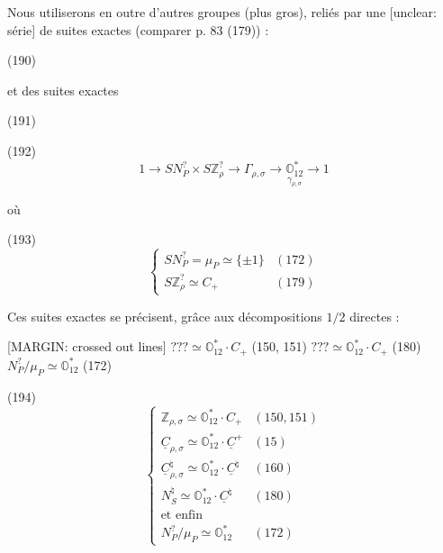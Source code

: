 Nous utiliserons en outre d'autres groupes (plus gros), reliés par une [unclear: série] de suites exactes (comparer p. 83 (179)) :

\newpage


(190)

et des suites exactes

(191)

(192)
$$1 \to S N^?_P \times S\mathbb{Z}^?_\rho \to \Gamma_{\rho,\sigma} \to \underset{\gamma_{\rho,\sigma}}{\mathbb{O}_{12}^*} \to 1$$

où

(193)
$$ \begin{cases} S N^?_P = \mu_P \simeq \{\pm 1\} & (172) \\ S\mathbb{Z}^?_\rho \simeq C_+ & (179) \end{cases} $$

Ces suites exactes se précisent, grâce
aux décompositions $1/2$ directes :

[MARGIN: crossed out lines]
$??? \simeq \mathbb{O}_{12}^* \cdot C_+$ (150, 151)
$??? \simeq \mathbb{O}_{12}^* \cdot C_+$ (180)
$N^?_P / \mu_P \simeq \mathbb{O}_{12}^*$ (172)

(194)
$$ \begin{cases} \mathbb{Z}_{\rho,\sigma} \simeq \mathbb{O}_{12}^* \cdot C_+ & (150, 151) \\ \underline{C}_{\rho,\sigma} \simeq \mathbb{O}_{12}^* \cdot \underline{C}^+ & (15) \\ \underline{C}^\natural_{\rho,\sigma} \simeq \mathbb{O}_{12}^* \cdot \underline{C}^\natural & (160) \\ N^\natural_S \simeq \mathbb{O}_{12}^* \cdot \underline{C}^\natural & (180) \\ \text{et enfin} \\ N^?_P / \mu_P \simeq \mathbb{O}_{12}^* & (172) \end{cases} $$

